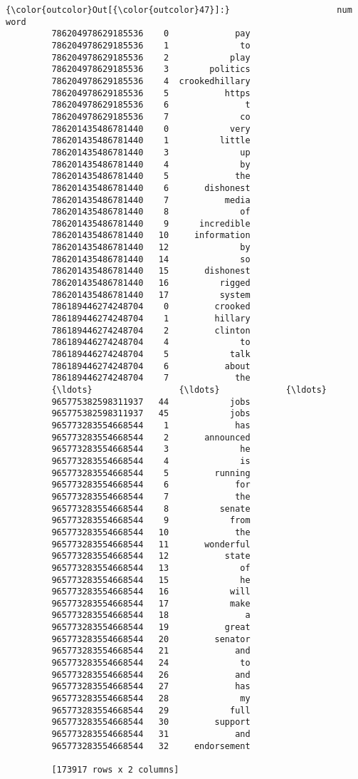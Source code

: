 \documentclass[11pt]{article}
\begin{document}
\begin{Verbatim}[commandchars=\\\{\}]
{\color{outcolor}Out[{\color{outcolor}47}]:}                     num            word
         786204978629185536    0             pay
         786204978629185536    1              to
         786204978629185536    2            play
         786204978629185536    3        politics
         786204978629185536    4  crookedhillary
         786204978629185536    5           https
         786204978629185536    6               t
         786204978629185536    7              co
         786201435486781440    0            very
         786201435486781440    1          little
         786201435486781440    3              up
         786201435486781440    4              by
         786201435486781440    5             the
         786201435486781440    6       dishonest
         786201435486781440    7           media
         786201435486781440    8              of
         786201435486781440    9      incredible
         786201435486781440   10     information
         786201435486781440   12              by
         786201435486781440   14              so
         786201435486781440   15       dishonest
         786201435486781440   16          rigged
         786201435486781440   17          system
         786189446274248704    0         crooked
         786189446274248704    1         hillary
         786189446274248704    2         clinton
         786189446274248704    4              to
         786189446274248704    5            talk
         786189446274248704    6           about
         786189446274248704    7             the
         {\ldots}                 {\ldots}             {\ldots}
         965775382598311937   44            jobs
         965775382598311937   45            jobs
         965773283554668544    1             has
         965773283554668544    2       announced
         965773283554668544    3              he
         965773283554668544    4              is
         965773283554668544    5         running
         965773283554668544    6             for
         965773283554668544    7             the
         965773283554668544    8          senate
         965773283554668544    9            from
         965773283554668544   10             the
         965773283554668544   11       wonderful
         965773283554668544   12           state
         965773283554668544   13              of
         965773283554668544   15              he
         965773283554668544   16            will
         965773283554668544   17            make
         965773283554668544   18               a
         965773283554668544   19           great
         965773283554668544   20         senator
         965773283554668544   21             and
         965773283554668544   24              to
         965773283554668544   26             and
         965773283554668544   27             has
         965773283554668544   28              my
         965773283554668544   29            full
         965773283554668544   30         support
         965773283554668544   31             and
         965773283554668544   32     endorsement
         
         [173917 rows x 2 columns]
\end{Verbatim}
            
\end{document}
